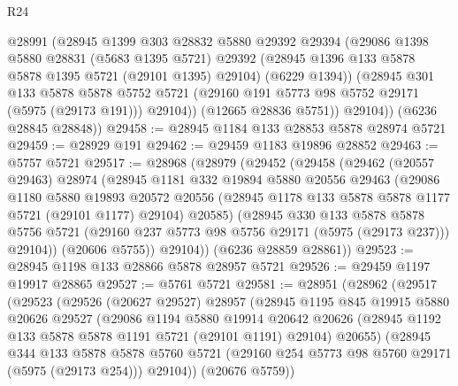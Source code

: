 \begin{lexlean}{R24}
\begin{coremodule}
            @28991
            (@28945
              @1399
              @303
              @28832
              @5880
              @29392
              @29394
              (@29086
                @1398
                @5880
                @28831
                (@5683 @1395 @5721)
                @29392
                (@28945 @1396 @133 @5878 @5878 @1395 @5721 (@29101 @1395) @29104)
                (@6229 @1394))
              (@28945
                @301
                @133
                @5878
                @5878
                @5752
                @5721
                (@29160 @191 @5773 @98 @5752 @29171 (@5975 (@29173 @191)))
                @29104))
            (@12665 @28836 @5751))
          @29104))
      (@6236 @28845 @28848))
@29458 := @28945 @1184 @133 @28853 @5878 @28974 @5721
@29459 := @28929 @191
@29462 := @29459 @1183 @19896 @28852
@29463 := @5757 @5721
@29517 := @28968
    (@28979
      (@29452
        (@29458
          (@29462
            (@20557 @29463)
            @28974
            (@28945
              @1181
              @332
              @19894
              @5880
              @20556
              @29463
              (@29086
                @1180
                @5880
                @19893
                @20572
                @20556
                (@28945 @1178 @133 @5878 @5878 @1177 @5721 (@29101 @1177) @29104)
                @20585)
              (@28945
                @330
                @133
                @5878
                @5878
                @5756
                @5721
                (@29160 @237 @5773 @98 @5756 @29171 (@5975 (@29173 @237)))
                @29104))
            (@20606 @5755))
          @29104))
      (@6236 @28859 @28861))
@29523 := @28945 @1198 @133 @28866 @5878 @28957 @5721
@29526 := @29459 @1197 @19917 @28865
@29527 := @5761 @5721
@29581 := @28951
    (@28962
      (@29517
        (@29523
          (@29526
            (@20627 @29527)
            @28957
            (@28945
              @1195
              @845
              @19915
              @5880
              @20626
              @29527
              (@29086
                @1194
                @5880
                @19914
                @20642
                @20626
                (@28945 @1192 @133 @5878 @5878 @1191 @5721 (@29101 @1191) @29104)
                @20655)
              (@28945
                @344
                @133
                @5878
                @5878
                @5760
                @5721
                (@29160 @254 @5773 @98 @5760 @29171 (@5975 (@29173 @254)))
                @29104))
            (@20676 @5759))

\end{coremodule}
\end{lexlean}
